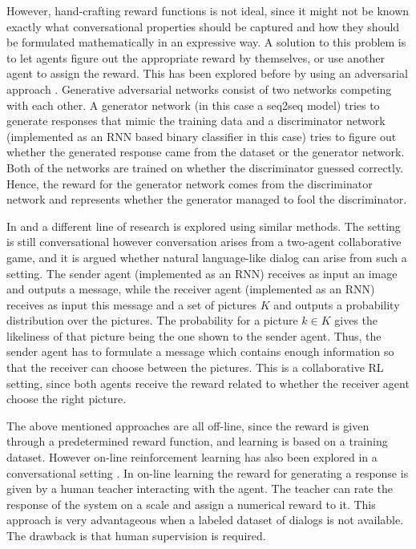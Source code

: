 \documentclass[12pt]{article}
\begin{document}
However, hand-crafting reward functions is not ideal, since it might not be known exactly what conversational properties should be captured and how they should be formulated mathematically in an expressive way. A solution to this problem is to let agents figure out the appropriate reward by themselves, or use another agent to assign the reward. This has been explored before by using an adversarial approach \cite{Li_adversarial:2017}. Generative adversarial networks \cite{Goodfellow:2014} consist of two networks competing with each other. A generator network (in this case a seq2seq model) tries to generate responses that mimic the training data and a discriminator network (implemented as an RNN based binary classifier in this case) tries to figure out whether the generated response came from the dataset or the generator network. Both of the networks are trained on whether the discriminator guessed correctly. Hence, the reward for the generator network comes from the discriminator network and represents whether the generator managed to fool the discriminator.

In \cite{Havrylov:2017} and \cite{Kottur:2017} a different line of research is explored using similar methods. The setting is still conversational however conversation arises from a two-agent collaborative game, and it is argued whether natural language-like dialog can arise from such a setting. The sender agent (implemented as an RNN) receives as input an image and outputs a message, while the receiver agent (implemented as an RNN) receives as input this message and a set of pictures \(K\) and outputs a probability distribution over the pictures. The probability for a picture \(k\in K\) gives the likeliness of that picture being the one shown to the sender agent. Thus, the sender agent has to formulate a message which contains enough information so that the receiver can choose between the pictures. This is a collaborative RL setting, since both agents receive the reward related to whether the receiver agent choose the right picture.

The above mentioned approaches are all off-line, since the reward is given through a predetermined reward function, and learning is based on a training dataset. However on-line reinforcement learning has also been explored in a conversational setting \cite{Li_HIL:2016}. In on-line learning the reward for generating a response is given by a human teacher interacting with the agent. The teacher can rate the response of the system on a scale and assign a numerical reward to it. This approach is very advantageous when a labeled dataset of dialogs is not available. The drawback is that human supervision is required.
\end{document}
